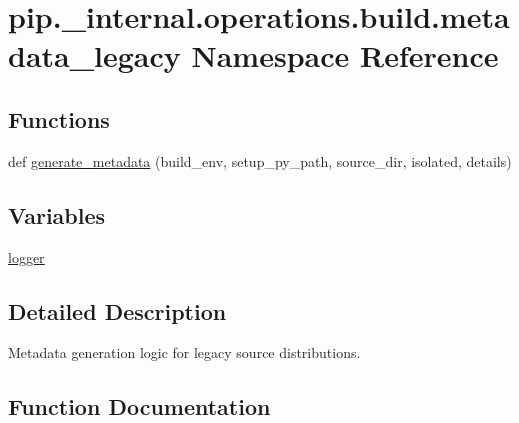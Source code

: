 \hypertarget{namespacepip_1_1__internal_1_1operations_1_1build_1_1metadata__legacy}{}\section{pip.\+\_\+internal.\+operations.\+build.\+metadata\+\_\+legacy Namespace Reference}
\label{namespacepip_1_1__internal_1_1operations_1_1build_1_1metadata__legacy}
\subsection*{Functions}
\begin{DoxyCompactItemize}
\item 
def \hyperlink{namespacepip_1_1__internal_1_1operations_1_1build_1_1metadata__legacy_ae2a0fbb44b5be13b73b61bee051cc51c}{generate\+\_\+metadata} (build\+\_\+env, setup\+\_\+py\+\_\+path, source\+\_\+dir, isolated, details)
\end{DoxyCompactItemize}
\subsection*{Variables}
\begin{DoxyCompactItemize}
\item 
\hyperlink{namespacepip_1_1__internal_1_1operations_1_1build_1_1metadata__legacy_ae07a76dc057c51776b8740cf4014eefd}{logger}
\end{DoxyCompactItemize}


\subsection{Detailed Description}
\begin{DoxyVerb}Metadata generation logic for legacy source distributions.
\end{DoxyVerb}
 

\subsection{Function Documentation}
\mbox{\label{namespacepip_1_1__internal_1_1operations_1_1build_1_1metadata__legacy_ae2a0fbb44b5be13b73b61bee051cc51c}} 
